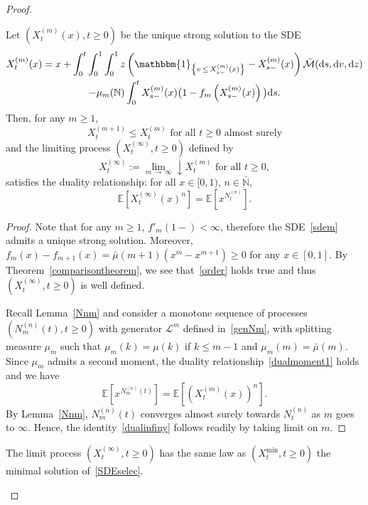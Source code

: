 \documentclass[AHL,Unicode,longabstracts,published]{cedram}
\newcommand{\ddr}{\mathrm{d}}
\newcommand{\bbmun}{\mathbbm{1}}
\newcommand{\bbN}{\mathbb{N}}
\newcommand{\bbE}{\mathbb{E}}
\newcommand{\clM}{\mathcal{M}}
\newcommand{\clL}{\mathcal{L}}
\begin{document}
\begin{proof}
\begin{lemm}\label{approxXa}
Let $(X_t^{(m)}(x),t\geq 0)$ be the unique strong solution to the SDE
\begin{multline}\label{sdem}
X^{(m)}_t(x)=x+\int_{0}^{t}\int_{0}^{1}\int_{0}^{1}z\left(\bbmun_{\left\{v\,\leq\,X^{(m)}_{s-}(x)\right\}}-X^{(m)}_{s-}(x)\right)\bar{\clM}(\ddr s,\ddr v, \ddr z) \\
-\mu_m(\bbN)\int_{0}^{t}X^{(m)}_{s-}(x)\big(1-f_m\left(X^{(m)}_{s-}(x)\right)\big)\ddr s.
\end{multline}
Then, for any $m\geq 1$,
\begin{equation}\label{order}
X_t^{(m+1)}\leq X_t^{(m)} \text{ for all } t\geq 0 \text{ almost surely}
\end{equation}
and the limiting process $(X^{(\infty)}_t,t\geq 0)$ defined by 
\[
X^{(\infty)}_t:=\underset{m\,\rightarrow\,\infty}{\lim}\!\! \downarrow X_t^{(m)} \text{ for all }t\geq 0,
\]
satisfies the duality relationship: for all $x\in [0,1)$, $n\in \bar{\bbN}$,
\begin{equation}\label{dualinfiny}
\bbE\left[X^{(\infty)}_t(x)^{n}\right]=\bbE\left[x^{N^{(n)}_t}\right].
\end{equation}
\end{lemm}

\begin{proof}
Note that for any $m\geq 1$, $f'_m(1-)<\infty$, therefore the SDE~\eqref{sdem} admits a unique strong solution. Moreover, $f_m(x)-f_{m+1}(x)=\bar{\mu}(m+1)(x^{m}-x^{m+1})\geq 0$ for any $x\in [0,1]$. By Theorem~\ref{comparisontheorem}, we see that~\eqref{order} holds true and thus $(X^{(\infty)}_t,t\geq 0) $ is well defined.

Recall Lemma~\ref{Nnm} and consider a monotone sequence of processes $(N^{(n)}_{m}(t),t\geq 0)$ with generator $\clL^m$ defined in~\eqref{genNm}, with splitting measure $\mu_m$ such that $\mu_{m}(k)=\mu(k)$ if $k\leq m-1$ and $\mu_m(m)=\bar{\mu}(m)$. Since $\mu_m$ admits a second moment, the duality relationship~\eqref{dualmoment1} holds and we have
\begin{equation}\label{dualm}
\bbE\left[x^{N_m^{(n)}(t)}\right]=\bbE\left[\left(X_t^{(m)}(x)\right)^{n}\right].
\end{equation}
By Lemma~\ref{Nnm}, $N_m^{(n)}(t)$ converges almost surely towards $N^{(n)}_t$ as $m$ goes to $\infty$. Hence, the identity~\eqref{dualinfiny} follows readily by taking limit on $m$.
\end{proof}

\begin{lemm}\label{identificationXinfinity}
The limit process $(X^{(\infty)}_t,t\geq 0)$ has the same law as $(X^{\min}_t,t\geq 0)$ the minimal solution of~\eqref{SDEselec}.
\end{lemm}


\end{proof}
\end{document}
